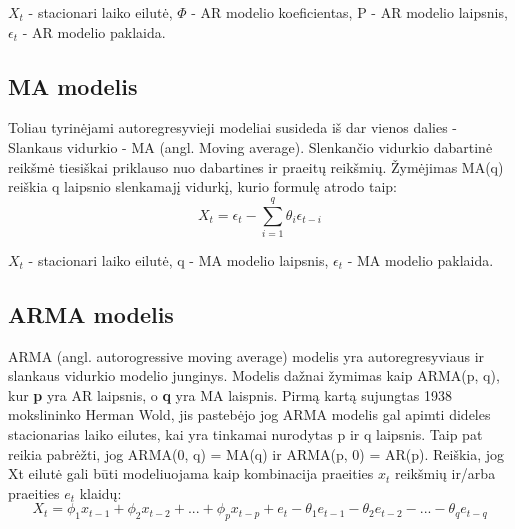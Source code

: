 \documentclass{VUMIFInfKursinis}
\begin{document}
${X_t}$ - stacionari laiko eilutė, $\Phi$ - AR modelio koeficientas, P - AR modelio laipsnis, $ \epsilon_{t} $ - AR modelio paklaida.

\subsection {MA modelis}
Toliau tyrinėjami autoregresyvieji modeliai susideda iš dar vienos dalies - Slankaus vidurkio - MA (angl. Moving average). Slenkančio vidurkio dabartinė
reikšmė tiesiškai priklauso nuo dabartines ir praeitų reikšmių. Žymėjimas MA(q) reiškia q laipsnio slenkamajį vidurkį, kurio formulę atrodo taip:  
\[X_{t} = \epsilon_{t} - \sum_{i=1}^{q}\theta_{i}  \epsilon_{t-i}\]

${X_t}$ - stacionari laiko eilutė, q - MA modelio laipsnis, ${\epsilon_t}$ - MA modelio paklaida.

\subsection {ARMA modelis}
ARMA (angl. autorogressive moving average) modelis yra autoregresyviaus ir slankaus vidurkio modelio junginys. Modelis dažnai žymimas
kaip ARMA(p, q), kur \textbf{p} yra AR laipsnis, o \textbf{q} yra MA laispnis. Pirmą kartą sujungtas 1938 mokslininko Herman Wold, jis pastebėjo jog ARMA modelis gal apimti 
dideles stacionarias laiko eilutes, kai yra tinkamai nurodytas p ir q laipsnis\cite{makridakis1997arma}. Taip pat reikia pabrėžti, 
jog ARMA(0, q) = MA(q) ir ARMA(p, 0) = AR(p). Reiškia, jog Xt eilutė gali būti modeliuojama kaip kombinacija praeities $x_{t}$ reikšmių ir/arba praeities $e_{t}$ klaidų:
\[X_{t} = \phi_{1}x_{t-1} + \phi_{2}x_{t-2} + ... + \phi_{p}x_{t-p} + e_{t} - \theta_{1}e_{t-1} - \theta_{2}e_{t-2} - ... - \theta_{q}e_{t-q}\]
\end{document}
